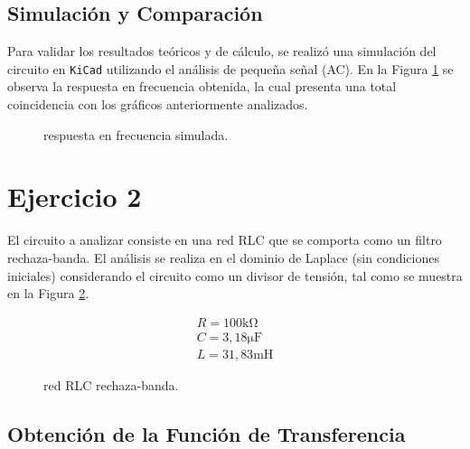 \subsection{Simulación y Comparación}

Para validar los resultados teóricos y de cálculo, se realizó una simulación del circuito en \texttt{KiCad} utilizando
el análisis de pequeña señal (AC). En la Figura \ref{fig:ej1_simulacion_kicad} se observa la respuesta en frecuencia
obtenida, la cual presenta una total coincidencia con los gráficos anteriormente analizados.

\begin{figure}[!ht]
    \centering
    
    \caption{respuesta en frecuencia simulada.}
    \label{fig:ej1_simulacion_kicad}
\end{figure}

\clearpage

\section{Ejercicio 2}

El circuito a analizar consiste en una red RLC que se comporta como un filtro rechaza-banda. El análisis se
realiza en el dominio de Laplace (sin condiciones iniciales) considerando el circuito como un divisor de tensión,
tal como se muestra en la Figura \ref{crkt:ej2_esquematico}.

\begin{figure}[!ht]
    \centering
    \begin{subfigure}[c]{0.45\textwidth}
        \centering
        
    \end{subfigure}
    \hfill
    \begin{subfigure}[c]{0.45\textwidth}
        \begin{gather*}
            R = 100 \si{\kilo\ohm} \\
            C = 3,18 \si{\micro\farad} \\
            L = 31,83 \si{\milli\henry}
        \end{gather*}
    \end{subfigure}
    \caption{red RLC rechaza-banda.}
    \label{crkt:ej2_esquematico}
\end{figure}


\subsection{Obtención de la Función de Transferencia}

